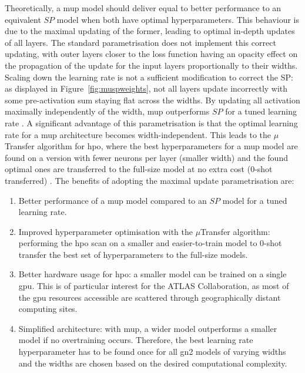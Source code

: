 Theoretically, a \gls{mup} model should deliver equal to better performance to an equivalent $SP$ model when both have optimal hyperparameters. This behaviour is due to the maximal updating of the former, leading to optimal in-depth updates of all layers. The standard parametrisation does not implement this correct updating, with outer layers closer to the loss function having an opacity effect on the propagation of the update for the input layers proportionally to their widths. Scaling down the learning rate is not a sufficient modification to correct the SP: as displayed in Figure~\ref{fig:muspweights}, not all layers update incorrectly with some pre-activation sum staying flat across the widths. By updating all activation maximally independently of the width, \gls{mup} outperforms $SP$ for a tuned learning rate \cite{pmlr-v139-yang21c}. A significant advantage of this parametrisation is that the optimal learning rate for a \gls{mup} architecture becomes width-independent. This leads to the $\mu$Transfer algorithm for \gls{hpo}, where the best hyperparameters for a \gls{mup} model are found on a version with fewer neurons per layer (smaller width) and the found optimal ones are transferred to the full-size model at no extra cost (0-shot transferred) \cite{yang2021tuning}. The benefits of adopting the maximal update parametrisation are:
\begin{enumerate}
  \item Better performance of a \gls{mup} model compared to an $SP$ model for a tuned learning rate.
  \item Improved hyperparameter optimisation with the $\mu$Transfer algorithm: performing the \gls{hpo} scan on a smaller and easier-to-train model to 0-shot transfer the best set of hyperparameters to the full-size models. 
  \item Better hardware usage for \gls{hpo}: a smaller model can be trained on a single \gls{gpu}. This is of particular interest for the ATLAS Collaboration, as most of the \gls{gpu} resources accessible are scattered through geographically distant computing sites.  
  \item Simplified architecture: with \gls{mup}, a wider model outperforms a smaller model if no overtraining occurs. Therefore, the best learning rate hyperparameter has to be found once for all \gls{gn2} models of varying widths and the widths are chosen based on the desired computational complexity.
\end{enumerate}

